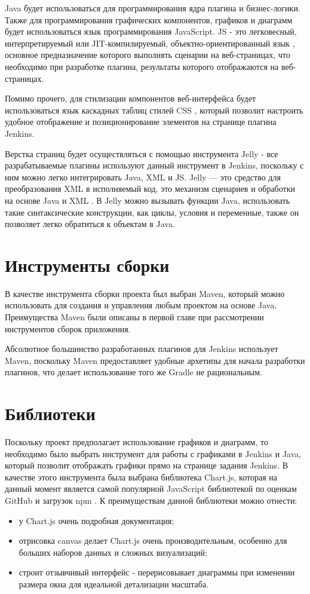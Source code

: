 Java будет использоваться для программирования ядра плагина и бизнес-логики. Также для программирования графических компонентов, графиков и диаграмм будет использоваться язык программирования JavaScript. JS - это легковесный, интерпретируемый или JIT-компилируемый, объектно-ориентированный язык \cite{js}, основное предназначение которого выполнять сценарии на веб-страницах, что необходимо при разработке плагина, результаты которого отображаются на веб-страницах.

Помимо прочего, для стилизации компонентов веб-интерфейса будет использоваться язык каскадных таблиц стилей CSS \cite{css}, который позволит настроить удобное отображение и позиционирование элементов на странице плагина Jenkins. 

Верстка страниц будет осуществляться с помощью инструмента Jelly - все разрабатываемые плагины используют данный инструмент в Jenkins, поскольку с ним можно легко интегрировать Java, XML и JS. Jelly — это средство для преобразования XML в исполняемый код, это механизм сценариев и обработки на основе Java и XML \cite{jelly}. В Jelly можно вызывать функции Java, использовать такие синтаксические конструкции, как циклы, условия и переменные, также он позволяет легко обратиться к объектам в Java.

\section{Инструменты сборки} \label{ch1:sec5}

В качестве инструмента сборки проекта был выбран Maven, который можно использовать для создания и управления любым проектом на основе Java. Преимущества Maven были описаны в первой главе при рассмотрении инструментов сборок приложения.

Абсолютное большинство разработанных плагинов для Jenkins использует Maven, поскольку Maven предоставляет удобные архетипы для начала разработки плагинов, что делает использование того же Gradle не рациональным.


\section{Библиотеки} \label{ch1:sec6}

Поскольку проект предполагает использование графиков и диаграмм, то необходимо было выбрать инструмент для работы с графиками в Jenkins и Java, который позволит отображать графики прямо на странице задания Jenkins. В качестве этого инструмента была выбрана библиотека Chart.js, которая на данный момент является самой популярной JavaScript библиотекой по оценкам GitHub и загрузок npm \cite{chartjs}. К преимуществам данной библиотеки можно отнести: 
\begin{itemize}
	\item у Chart.js очень подробная документация;
	\item отрисовка canvas делает Chart.js очень производительным, особенно для больших наборов данных и сложных визуализаций;
	\item строит отзывчивый интерфейс - перерисовывает диаграммы при изменении размера окна для идеальной детализации масштаба.
\end{itemize}

